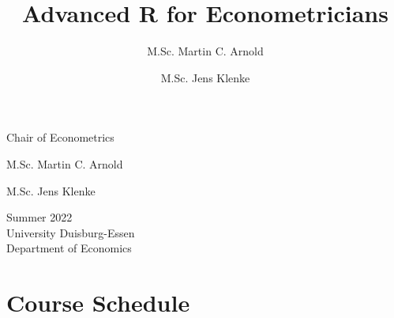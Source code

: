 \documentclass[]{article}
\author{\Large M.Sc. Martin C.
Arnold\vspace{0.05in} \newline\normalsize\emph{}   \and \Large M.Sc.
Jens Klenke\vspace{0.05in} \newline\normalsize\emph{}  }
\title{\center Advanced R for Econometricians \\[1em]\smaller{Semester
overview}  }
\date{}
\begin{document}
	
%    


{%

{

\vskip 40pt\relax \normalsize\fontsize{11}{12}

\begin{minipage}[t]{.49\textwidth}
Chair of Econometrics

M.Sc. Martin C. Arnold \hskip 15pt \emph{\small }   \par M.Sc. Jens
Klenke \hskip 15pt \emph{\small }   
\end{minipage}%
%
\hfill
%
\begin{minipage}[t]{.49\textwidth}
  \begin{flushright}
    Summer 2022\\
    University Duisburg-Essen\\
    Department of Economics\\
  \end{flushright}
\end{minipage}

\vspace{20pt}

}

\setlength{\parindent}{0pt}
\thispagestyle{plain}
{\fontsize{10}{10}\selectfont\raggedright 
{\let\newpage\relax\maketitle}

}


}

\vskip 8.5pt





\vskip 6.5pt


\noindent  \hypertarget{course-schedule}{%
\section{Course Schedule}\label{course-schedule}}
\end{document}
